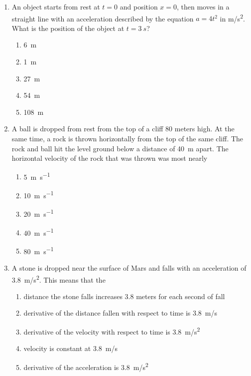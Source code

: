 \documentclass{../../oss-apphys}
\begin{document}
\begin{multicols}{2}
\begin{enumerate}[resume,leftmargin=18pt]
\begin{enumerate}[noitemsep,topsep=0pt,leftmargin=18pt,label=(\Alph*)]
    \end{enumerate}
  \item An object starts from rest at $t=0$ and position $x=0$, then moves in a
    straight line with an acceleration described by the equation $a=4t^2$ in
    \si{m/s^2}. What is the position of the object at $t=\SI{3}{s}$?
    \begin{enumerate}[noitemsep,topsep=0pt,leftmargin=18pt,label=(\Alph*)]
    \item\SI{6}{\metre}
    \item\SI{1}{\metre}
    \item\SI{27}{\metre}
    \item\SI{54}{\metre}
    \item\SI{108}{\metre}
    \end{enumerate}
    
  \item A ball is dropped from rest from the top of a cliff $80$ meters high. At
    the same time, a rock is thrown horizontally from the top of the same
    cliff. The rock and ball hit the level ground below a distance of
    \SI{40}{\metre} apart. The horizontal velocity of the rock that was thrown
    was most nearly
    \begin{enumerate}[noitemsep,topsep=0pt,leftmargin=18pt,label=(\Alph*)]
    \item\SI{5}{\metre\per\second}
    \item\SI{10}{\metre\per\second}
    \item\SI{20}{\metre\per\second}
    \item\SI{40}{\metre\per\second}
    \item\SI{80}{\metre\per\second}
    \end{enumerate}
    
  \item A stone is dropped near the surface of Mars and falls with an
    acceleration of \SI{3.8}{m/s^2}. This means that the
    \begin{enumerate}[noitemsep,topsep=0pt,leftmargin=18pt,label=(\Alph*)]
    \item distance the stone falls increases 3.8 meters for each second of
      fall
    \item derivative of the distance fallen with respect to time is
      \SI{3.8}{m/s}
    \item derivative of the velocity with respect to time is \SI{3.8}{m/s^2}
    \item velocity is constant at \SI{3.8}{m/s}
    \item derivative of the acceleration is \SI{3.8}{m/s^2}
    \end{enumerate}


\end{enumerate}
\end{multicols}
\end{document}
